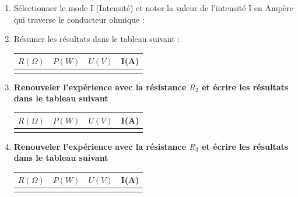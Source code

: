 \documentclass[11pt,a4paper]{article}
\begin{document}
\begin{enumerate}[label*=1.\arabic*.]
\item Sélectionner le mode I (Intensité) et noter la valeur de l'intensité I en Ampère qui traverse le conducteur ohmique : 

\vspace{3mm}
\dotfill 

\item Résumer les résultats dans le tableau suivant : 

\begin{center}
    

    \begin{tabular}{|C{3cm}|C{3cm}|C{3cm}|C{3cm}|}
         \hline
         $R(\Omega)$ & $P(W)$ &  $U(V)$ & I(A) \\

         \hline
           &  &  &  \\
         \hline
 
    \end{tabular}
\end{center}




 
\vfill

\newpage 

\item \textbf{Renouveler l'expérience avec la résistance $R_2$ et écrire les résultats dans le tableau suivant} 


\begin{center}
    

    \begin{tabular}{|C{3cm}|C{3cm}|C{3cm}|C{3cm}|}
         \hline
         $R(\Omega)$ & $P(W)$ &  $U(V)$ & I(A) \\

         \hline
           &  &  &  \\
         \hline
 
    \end{tabular}
\end{center}



\item \textbf{Renouveler l'expérience avec la résistance $R_3$ et écrire les résultats dans le tableau suivant} 

\begin{center}
    

    \begin{tabular}{|C{3cm}|C{3cm}|C{3cm}|C{3cm}|}
         \hline
         $R(\Omega)$ & $P(W)$ &  $U(V)$ & I(A) \\

         \hline
           &  &  &  \\
         \hline
 
    \end{tabular}
\end{center}




\end{enumerate}
\end{document}
